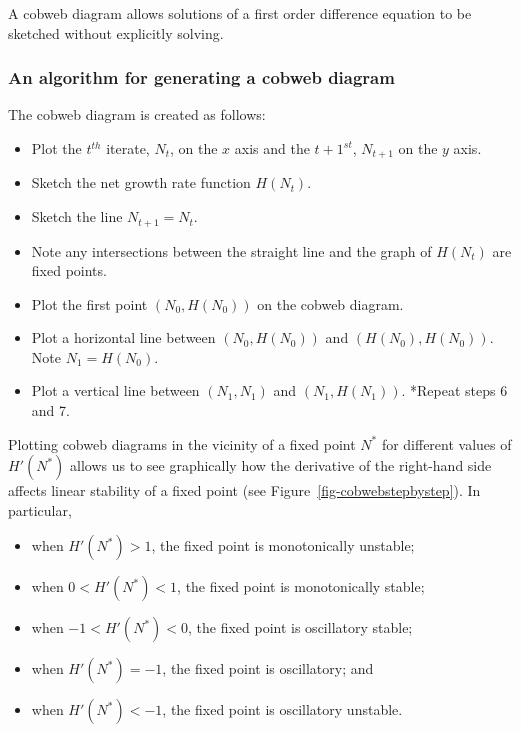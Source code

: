\documentclass[
  letterpaper,
  DIV=11,
  numbers=noendperiod]{scrreprt}
\providecommand{\tightlist}{%
  \setlength{\itemsep}{0pt}\setlength{\parskip}{0pt}}\usepackage{longtable,booktabs,array}
\begin{document}
A cobweb diagram allows solutions of a first order difference equation
to be sketched without explicitly solving.

\hypertarget{an-algorithm-for-generating-a-cobweb-diagram}{%
\subsubsection{An algorithm for generating a cobweb
diagram}\label{an-algorithm-for-generating-a-cobweb-diagram}}

The cobweb diagram is created as follows:

\begin{itemize}
\tightlist
\item
  Plot the \(t^{th}\) iterate, \(N_t\), on the \(x\) axis and the
  \(t+1^{st}\), \(N_{t+1}\) on the \(y\) axis.
\item
  Sketch the net growth rate function \(H(N_t)\).
\item
  Sketch the line \(N_{t+1}=N_t\).
\item
  Note any intersections between the straight line and the graph of
  \(H(N_t)\) are fixed points.
\item
  Plot the first point \((N_0, H(N_0))\) on the cobweb diagram.
\item
  Plot a horizontal line between \((N_0, H(N_0))\) and
  \((H(N_0),H(N_0))\). Note \(N_1=H(N_0)\).
\item
  Plot a vertical line between \((N_1,N_1)\) and \((N_1,H(N_1))\).
  *Repeat steps 6 and 7.
\end{itemize}

Plotting cobweb diagrams in the vicinity of a fixed point \(N^*\) for
different values of \(H'(N^*)\) allows us to see graphically how the
derivative of the right-hand side affects linear stability of a fixed
point (see Figure~\ref{fig-cobwebstepbystep}). In particular,

\begin{itemize}
\tightlist
\item
  when \(H'(N^*)>1\), the fixed point is monotonically unstable;
\item
  when \(0<H'(N^*)<1\), the fixed point is monotonically stable;
\item
  when \(-1<H'(N^*)<0\), the fixed point is oscillatory stable;
\item
  when \(H'(N^*)=-1\), the fixed point is oscillatory; and
\item
  when \(H'(N^*)<-1\), the fixed point is oscillatory unstable.
\end{itemize}
\end{document}
